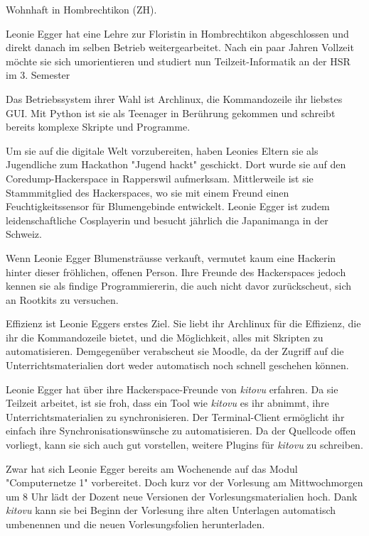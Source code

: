 \documentclass[a4paper]{article}
\begin{document}
\begin{description}[uclist]
	\item[Adresse] Wohnhaft in Hombrechtikon (ZH).
	\item[Ausbildung und Beruf] Leonie Egger hat eine Lehre zur Floristin in Hombrechtikon abgeschlossen und direkt danach im selben Betrieb weitergearbeitet. Nach ein paar Jahren Vollzeit möchte sie sich umorientieren und studiert nun Teilzeit-Informatik an der HSR im 3. Semester
	\item[Informatikkenntnisse] Das Betriebssystem ihrer Wahl ist Archlinux, die Kommandozeile ihr liebstes GUI. Mit Python ist sie als Teenager in Berührung gekommen und schreibt bereits komplexe Skripte und Programme.
	\item[Freizeitbeschäftigung] Um sie auf die digitale Welt vorzubereiten, haben Leonies Eltern sie als Jugendliche zum Hackathon "Jugend hackt" geschickt. Dort wurde sie auf den Coredump-Hackerspace in Rapperswil aufmerksam. Mittlerweile ist sie Stammmitglied des Hackerspaces, wo sie mit einem Freund einen Feuchtigkeitssensor für Blumengebinde entwickelt. Leonie Egger ist zudem leidenschaftliche Cosplayerin und besucht jährlich die Japanimanga in der Schweiz.
	\item[Persönlichkeit] Wenn Leonie Egger Blumensträusse verkauft, vermutet kaum eine Hackerin hinter dieser fröhlichen, offenen Person. Ihre Freunde des Hackerspaces jedoch kennen sie als findige Programmiererin, die auch nicht davor zurückscheut, sich an Rootkits zu versuchen.
	\item[Einschränkungen, Ziele und Wünsche] Effizienz ist Leonie Eggers erstes Ziel. Sie liebt ihr Archlinux für die Effizienz, die ihr die Kommandozeile bietet, und die Möglichkeit, alles mit Skripten zu automatisieren. Demgegenüber verabscheut sie Moodle, da der Zugriff auf die Unterrichtsmaterialien dort weder automatisch noch schnell geschehen können.
	\item[Erwartungen an \emph{kitovu}] Leonie Egger hat über ihre Hackerspace-Freunde von \emph{kitovu} erfahren. Da sie Teilzeit arbeitet, ist sie froh, dass ein Tool wie \emph{kitovu} es ihr abnimmt, ihre Unterrichtsmaterialien zu synchronisieren. Der Terminal-Client ermöglicht ihr einfach ihre Synchronisationswünsche zu automatisieren. Da der Quellcode offen vorliegt, kann sie sich auch gut vorstellen, weitere Plugins für \emph{kitovu} zu schreiben.
	\item[Szenario: "Kurzfristige Änderungen"] Zwar hat sich Leonie Egger bereits am Wochenende auf das Modul "Computernetze 1" vorbereitet. Doch kurz vor der Vorlesung am Mittwochmorgen um 8 Uhr lädt der Dozent neue Versionen der Vorlesungsmaterialien hoch. Dank \emph{kitovu} kann sie bei Beginn der Vorlesung ihre alten Unterlagen automatisch umbenennen und die neuen Vorlesungsfolien herunterladen.
\end{description}
\end{document}
